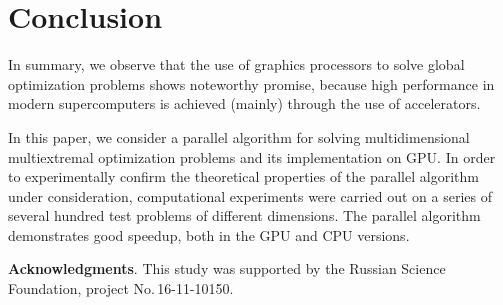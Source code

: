 \documentclass{svproc}
\begin{document}
\section{Conclusion}

In summary, we observe that the use of graphics processors to solve global optimization problems shows noteworthy promise, because high performance in modern supercomputers is achieved (mainly) through the use of accelerators.

In this paper, we consider a parallel algorithm for solving multidimensional multiextremal optimization problems and its implementation on GPU. In order to experimentally confirm the theoretical properties of the parallel algorithm under consideration, computational experiments were carried out on a series of several hundred test problems of different dimensions. The parallel algorithm demonstrates good speedup, both in the GPU and CPU versions.

\medskip

\textbf{Acknowledgments}. This study was supported by the Russian Science Foundation, project No.\,16-11-10150.

%
%

{}
\end{document}
